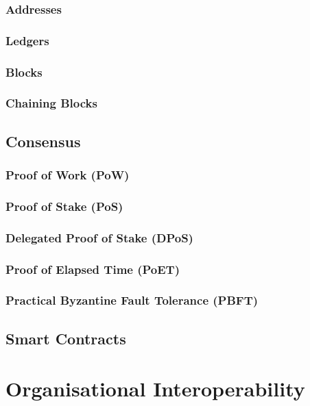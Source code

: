 \subsubsection{Addresses}

\subsubsection{Ledgers}

\subsubsection{Blocks}

\subsubsection{Chaining Blocks}

\subsection{Consensus}

\subsubsection{Proof of Work (PoW)}

\subsubsection{Proof of Stake (PoS)}

\subsubsection{Delegated Proof of Stake (DPoS)}

\subsubsection{Proof of Elapsed Time (PoET)}

\subsubsection{Practical Byzantine Fault Tolerance (PBFT)}

\subsection{Smart Contracts}

\section{Organisational Interoperability}

